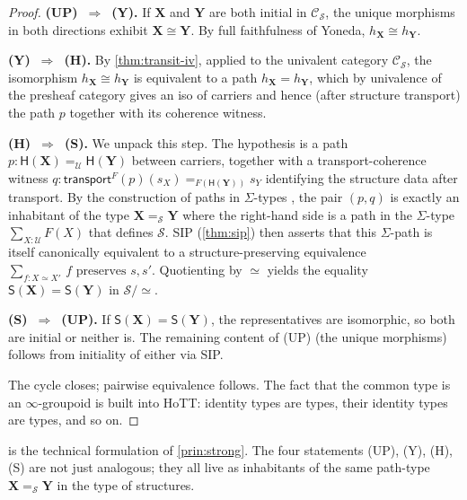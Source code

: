 \documentclass[12pt]{article}
\theoremstyle{definition}
\theoremstyle{remark}
\newcommand{\U}{\mathcal{U}}
\newcommand{\transport}{\mathsf{transport}}
\newcommand{\eqv}{\simeq}
\newcommand{\iso}{\cong}
\begin{document}
\begin{proof}
\textbf{(UP)~$\Rightarrow$~(Y).} If $\mathbf{X}$ and $\mathbf{Y}$ are
both initial in $\mathcal{C}_\mathcal{S}$, the unique morphisms in both
directions exhibit $\mathbf{X} \iso \mathbf{Y}$. By full faithfulness of
Yoneda, $h_{\mathbf{X}} \iso h_{\mathbf{Y}}$.

\textbf{(Y)~$\Rightarrow$~(H).} By \cref{thm:transit-iv}, applied to the
univalent category $\mathcal{C}_\mathcal{S}$, the isomorphism
$h_{\mathbf{X}} \iso h_{\mathbf{Y}}$ is equivalent to a path
$h_{\mathbf{X}} = h_{\mathbf{Y}}$, which by univalence of the presheaf
category gives an iso of carriers and hence (after structure transport)
the path $p$ together with its coherence witness.

\textbf{(H)~$\Rightarrow$~(S).} We unpack this step. The hypothesis is a
path $p\colon \mathsf{H}(\mathbf{X}) =_\U \mathsf{H}(\mathbf{Y})$
between carriers, together with a transport-coherence witness
$q\colon \transport^F(p)(s_X) =_{F(\mathsf{H}(\mathbf{Y}))} s_Y$
identifying the structure data after transport. By the construction of
paths in $\Sigma$-types
\cite[Theorem~2.7.2]{HoTTBook}, the pair $(p, q)$ is exactly an
inhabitant of the type $\mathbf{X} =_\mathcal{S} \mathbf{Y}$ where the
right-hand side is a path in the $\Sigma$-type
$\sum_{X : \U} F(X)$ that defines $\mathcal{S}$. SIP
(\cref{thm:sip}) then asserts that this $\Sigma$-path is itself
canonically equivalent to a structure-preserving equivalence
$\sum_{f : X \eqv X'}\, f \text{ preserves } s, s'$. Quotienting by
$\eqv$ yields the equality
$\mathsf{S}(\mathbf{X}) = \mathsf{S}(\mathbf{Y})$ in
$\mathcal{S}/\eqv$.

\textbf{(S)~$\Rightarrow$~(UP).} If
$\mathsf{S}(\mathbf{X}) = \mathsf{S}(\mathbf{Y})$, the representatives are
isomorphic, so both are initial or neither is. The remaining content of
(UP) (the unique morphisms) follows from initiality of either via SIP.

The cycle closes; pairwise equivalence follows. The fact that the common
type is an $\infty$-groupoid is built into HoTT: identity types are types,
their identity types are types, and so on.
\end{proof}

 is the technical formulation of
\cref{prin:strong}. The four statements (UP), (Y), (H), (S) are not just
analogous; they all live as inhabitants of the same path-type
$\mathbf{X} =_\mathcal{S} \mathbf{Y}$ in the type of structures.
\end{document}

